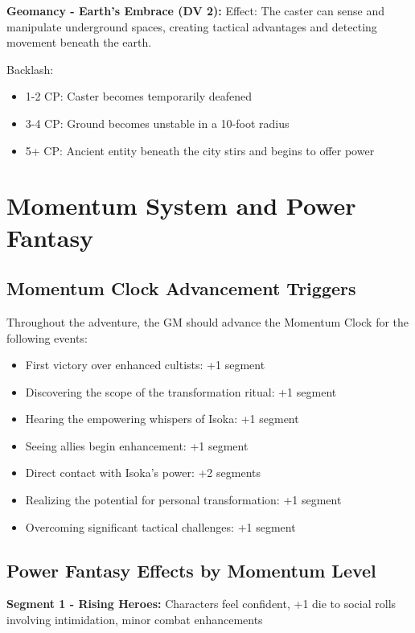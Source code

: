 \documentclass[12pt,twoside]{article}
\begin{document}
\textbf{Geomancy - Earth's Embrace (DV 2):}
Effect: The caster can sense and manipulate underground spaces, creating tactical advantages and detecting movement beneath the earth.

Backlash:
\begin{itemize}
  \item 1-2 CP: Caster becomes temporarily deafened
  \item 3-4 CP: Ground becomes unstable in a 10-foot radius
  \item 5+ CP: Ancient entity beneath the city stirs and begins to offer power
\end{itemize}

\section{Momentum System and Power Fantasy}

\subsection{Momentum Clock Advancement Triggers}

Throughout the adventure, the GM should advance the Momentum Clock for the following events:

\begin{itemize}
  \item First victory over enhanced cultists: +1 segment
  \item Discovering the scope of the transformation ritual: +1 segment
  \item Hearing the empowering whispers of Isoka: +1 segment
  \item Seeing allies begin enhancement: +1 segment
  \item Direct contact with Isoka's power: +2 segments
  \item Realizing the potential for personal transformation: +1 segment
  \item Overcoming significant tactical challenges: +1 segment
\end{itemize}

\subsection{Power Fantasy Effects by Momentum Level}

\textbf{Segment 1 - Rising Heroes:} Characters feel confident, +1 die to social rolls involving intimidation, minor combat enhancements
\end{document}
